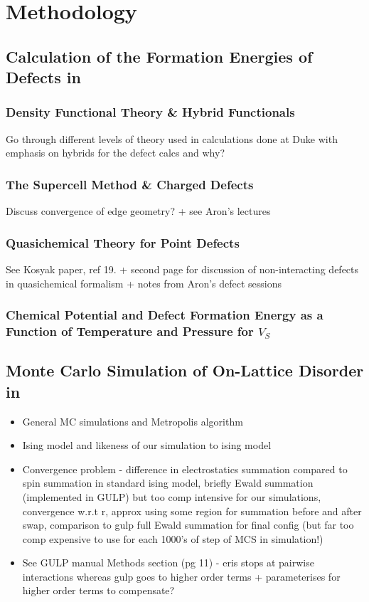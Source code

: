 \chapter{Methodology}

\section{Calculation of the Formation Energies of Defects in \CZTS}
\subsection{Density Functional Theory \& Hybrid Functionals}
Go through different levels of theory used in calculations done at Duke with emphasis on hybrids for the defect calcs and why?

\subsection{The Supercell Method \& Charged Defects}
Discuss convergence of edge geometry? + see Aron's lectures

\subsection{Quasichemical Theory for Point Defects}
See Kosyak paper, ref 19. + second page for discussion of non-interacting defects in quasichemical formalism + notes from Aron's defect sessions

\subsection{Chemical Potential and Defect Formation Energy as a Function of Temperature and Pressure for $V_S$}

\section{Monte Carlo Simulation of On-Lattice Disorder  in \CZTS}
\begin{itemize}
\item General MC simulations and Metropolis algorithm
\item Ising model and likeness of our simulation to ising model
\item Convergence problem - difference in electrostatics summation compared to spin summation in standard ising model, briefly Ewald summation (implemented in GULP) but too comp intensive for our simulations, convergence w.r.t r, approx using some region for summation before and after swap, comparison to gulp full Ewald summation for final config (but far too comp expensive to use for each 1000's of  step of MCS in simulation!)
\item See GULP manual Methods section (pg 11) - eris stops at pairwise interactions whereas gulp goes to higher order terms + parameterises for higher order terms to compensate?
\end{itemize}

